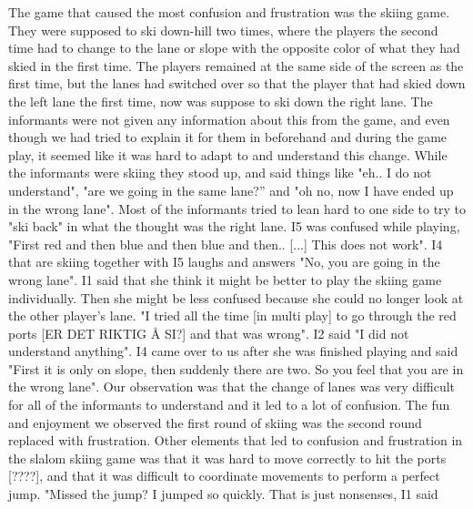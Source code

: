 The game that caused the most confusion and frustration was the skiing game. They were supposed to ski down-hill two times, where the players the second time had to change to the lane or slope with the opposite color of what they had skied in the first time. The players remained at the same side of the screen as the first time, but the lanes had switched over so that the player that had skied down the left lane the first time, now was suppose to ski down the right lane. The informants were not given any information about this from the game, and even though we had tried to explain it for them in beforehand and during the game play, it seemed like it was hard to adapt to and understand this change. While the informants were skiing they stood up, and said things like "eh.. I do not understand", "are we going in the same lane?” and "oh no, now I have ended up in the wrong lane". Most of the informants tried to lean hard to one side to try to "ski back" in what the thought was the right lane. I5 was confused while playing, "First red and then blue and then blue and then.. [...] This does not work". I4 that are skiing together with I5 laughs and answers "No, you are going in the wrong lane". I1 said that she think it might be better to play the skiing game individually. Then she might be less confused because she could no longer look at the other player's lane. "I tried all the time [in multi play] to go through the red ports [ER DET RIKTIG Å SI?] and that was wrong". I2 said "I did not understand anything". I4 came over to us after she was finished playing and said "First it is only on slope, then suddenly there are two. So you feel that you are in the wrong lane". Our observation was that the change of lanes was very difficult for all of the informants to understand and it led to a lot of confusion. The fun and enjoyment we observed the first round of skiing was the second round replaced with frustration. Other elements that led to confusion and frustration in the slalom skiing game was that it was hard to move correctly to hit the ports [????], and that it was difficult to coordinate movements to perform a perfect jump. "Missed the jump? I jumped so quickly. That is just nonsenses, I1 said

